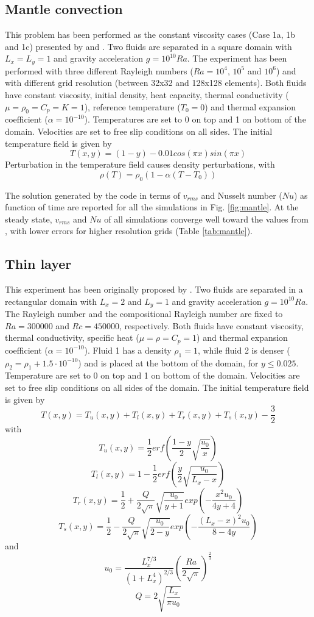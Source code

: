 \documentclass[draft,tec]{agutexSI2019}
\begin{document}
\begin{article}
\subsection{Mantle convection}\label{sec:mantle}
This problem has been performed as the constant viscosity cases (Case 1a, 1b and 1c) presented by  and . Two fluids are separated in a square domain with $L_x=L_y=1$ and gravity acceleration $g=10^{10}Ra$. The experiment has been performed with three different Rayleigh numbers ($Ra=10^4$, $10^5$ and $10^6$) and with different grid resolution (between 32x32 and 128x128 elements). Both fluids have constant viscosity, initial density, heat capacity, thermal conductivity ($\mu= \rho_0= C_p = K=1$), reference temperature ($T_0=0$) and thermal expansion coefficient ($\alpha=10^{-10}$). Temperatures are set to 0 on top and 1 on bottom of the domain. Velocities are set to free slip conditions on all sides. The initial temperature field is given by \[T(x,y)=(1-y)-0.01 cos (\pi x) sin (\pi x)\]
Perturbation in the temperature field causes density perturbations, with \[\rho(T)=\rho_0(1-\alpha(T-T_0))\]

The solution generated by the code in terms of $v_{rms}$ and Nusselt number ($Nu$) as function of time are reported for all the simulations in Fig. \ref{fig:mantle}. At the steady state, $v_{rms}$ and $Nu$ of all simulations converge well toward the values from , with lower errors for higher resolution grids (Table \ref{tab:mantle}).

\subsection{Thin layer}\label{sec:thin}
This experiment has been originally proposed by . Two fluids are separated in a rectangular domain with $L_x=2$ and $L_y=1$ and gravity acceleration $g=10^{10}Ra$. The Rayleigh number and the compositional Rayleigh number are fixed to $Ra=300000$ and $Rc=450000$, respectively. Both fluids have constant viscosity, thermal conductivity, specific heat ($\mu=\rho=C_p=1$) and thermal expansion coefficient ($\alpha=10^{-10}$). Fluid 1 has a density $\rho_1=1$, while fluid 2 is denser ($\rho_2=\rho_1+1.5 \cdot 10^{-10}$) and is placed at the bottom of the domain, for $y \leq 0.025$. Temperature are set to 0 on top and 1 on bottom of the domain. Velocities are set to free slip conditions on all sides of the domain. The initial temperature field is given by
\[T(x,y)=T_u(x,y)+T_l(x,y)+T_r(x,y)+T_s(x,y)-\frac{3}{2}\]
with
\[T_u(x,y)=\frac{1}{2}erf\left(\frac{1-y}{2}\sqrt{\frac{u_0}{x}}\right)\]
\[T_l(x,y)=1-\frac{1}{2}erf\left(\frac{y}{2}\sqrt{\frac{u_0}{L_x-x}}\right)\]
\[T_r(x,y)=\frac{1}{2}+\frac{Q}{2\sqrt{\pi}}\sqrt{\frac{u_0}{y+1}} exp\left(-\frac{x^2u_0}{4y+4}\right)\]
\[T_s(x,y)=\frac{1}{2}-\frac{Q}{2\sqrt{\pi}}\sqrt{\frac{u_0}{2-y}} exp\left(-\frac{(L_x-x)^2u_0}{8-4y}\right)\]
and
\[u_0=\frac{L_x^{7/3}}{(1+L_x^4)^{2/3}}\left(\frac{Ra}{2\sqrt{\pi}}\right)^{\frac{2}{3}}\]
\[Q=2\sqrt{\frac{L_x}{\pi u_0}}\]


\end{article}
\end{document}
